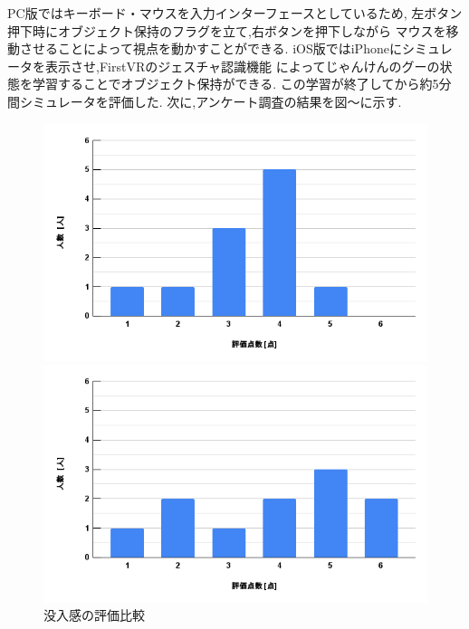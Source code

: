 \documentclass{ltjsreport}
\begin{document}
		PC版ではキーボード・マウスを入力インターフェースとしているため,
		左ボタン押下時にオブジェクト保持のフラグを立て,右ボタンを押下しながら
		マウスを移動させることによって視点を動かすことができる.
		iOS版ではiPhoneにシミュレータを表示させ,FirstVRのジェスチャ認識機能
		によってじゃんけんのグーの状態を学習することでオブジェクト保持ができる.
		この学習が終了してから約5分間シミュレータを評価した.
\clearpage
		次に,アンケート調査の結果を図～に示す.

		\begin{figure}[H]
		\centering
		\begin{minipage}{0.45\columnwidth}
		\centering
		\includegraphics[width = \columnwidth]{../figs/PC-1.png}
		\end{minipage}
		\hspace{0.04\columnwidth}
		\begin{minipage}{0.45\columnwidth}
		\centering
		\includegraphics[width = \columnwidth]{../figs/iOS-1.png}
		\end{minipage}
		\caption{没入感の評価比較}
		\label{fig:botunyu}
		\end{figure}
		\vspace{-15pt}
		
\end{document}
